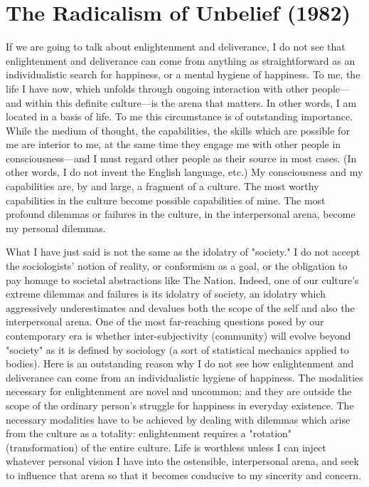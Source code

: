 \chapter{The Radicalism of Unbelief (1982)}

If we are going to talk about enlightenment and deliverance, I do not see that 
enlightenment and deliverance can come from anything as straightforward as an 
individualistic search for happiness, or a mental hygiene of happiness. To me, the 
life I have now, which unfolds through ongoing interaction with other people---and 
within this definite culture---is the arena that matters. In other words, I am located 
in a  basis of life. To me this circumstance is of outstanding importance. 
While the medium of thought, the capabilities, the skills which are possible for me 
are interior to me, at the same time they engage me with other people in 
consciousness---and I must regard other people as their source in most cases. (In other 
words, I do not invent the English language, etc.) My consciousness and my 
capabilities are, by and large, a fragment of a culture. The most worthy capabilities 
in the culture become possible capabilities of mine. The most profound dilemmas 
or failures in the culture, in the interpersonal arena, become my personal dilemmas. 

What I have just said is not the same as the idolatry of "society." I do not accept 
the sociologists' notion of reality, or conformism as a goal, or the obligation to pay 
homage to societal abstractions like The Nation. Indeed, one of our culture's 
extreme dilemmas and failures is its idolatry of society, an idolatry which aggressively 
underestimates and devalues both the scope of the self and also the interpersonal 
arena. One of the most far-reaching questions posed by our contemporary 
era is whether inter-subjectivity (community) will evolve beyond "society" as it is 
defined by sociology (a sort of statistical mechanics applied to bodies). Here is an 
outstanding reason why I do not see how enlightenment and deliverance can come 
from an individualistic hygiene of happiness. The modalities necessary for enlightenment 
are novel and uncommon; and they are outside the scope of the ordinary 
person's struggle for happiness in everyday existence. The necessary modalities 
have to be achieved by dealing with dilemmas which arise from the culture as a 
totality: enlightenment requires a "rotation" (transformation) of the entire culture. 
Life is worthless unless I can inject whatever personal vision I have into the 
ostensible, interpersonal arena, and seek to influence that arena so that it becomes 
conducive to my sincerity and concern. 


